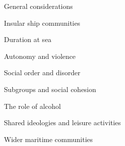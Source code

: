 \begin{listWWNumvileveli}
\item 
\setcounter{listWWNumvilevelii}{0}
\begin{listWWNumvilevelii}
\item 
\begin{styleListParagraph}
General considerations
\end{styleListParagraph}

\item 
\begin{styleListParagraph}
Insular ship communities 
\end{styleListParagraph}


\setcounter{listWWNumvileveliii}{0}
\begin{listWWNumvileveliii}
\item 
\begin{styleListParagraph}
Duration at sea
\end{styleListParagraph}

\item 
\begin{styleListParagraph}
Autonomy and violence
\end{styleListParagraph}

\item 
\begin{styleListParagraph}
Social order and disorder 
\end{styleListParagraph}

\item 
\begin{styleListParagraph}
Subgroups and social cohesion
\end{styleListParagraph}

\item 
\begin{styleListParagraph}
The role of alcohol
\end{styleListParagraph}

\item 
\begin{styleListParagraph}
Shared ideologies and leisure activities 
\end{styleListParagraph}

\end{listWWNumvileveliii}
\item 
\begin{styleListParagraph}
Wider maritime communities 
\end{styleListParagraph}



\end{listWWNumvilevelii}
\end{listWWNumvileveli}
